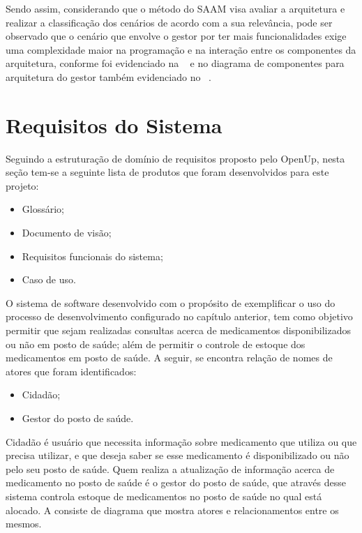 Sendo assim, considerando que o método do \acrfull{SAAM} visa avaliar a arquitetura e realizar a classificação dos cenários de acordo com a sua relevância, pode ser observado que o cenário que envolve o gestor por ter mais funcionalidades exige uma complexidade maior na programação e na interação entre os componentes da arquitetura, conforme foi evidenciado na ~ e no diagrama de componentes para arquitetura do gestor também evidenciado no ~.


\section{Requisitos do Sistema}
\label{sec:visão do sistema}

Seguindo a estruturação de domínio de requisitos proposto pelo \acrfull{OpenUp}, nesta seção tem-se a seguinte lista de produtos que foram desenvolvidos para este projeto:
\begin{itemize}
    \item Glossário;
    \item Documento de visão;
    \item Requisitos funcionais do sistema;
    \item Caso de uso.
\end{itemize}

O sistema de software desenvolvido com o propósito de  exemplificar o uso do processo de desenvolvimento configurado no capítulo anterior, tem como objetivo permitir que sejam realizadas consultas acerca de medicamentos disponibilizados ou não em posto de saúde; além de permitir o controle de estoque dos medicamentos em posto de saúde. A seguir, se encontra relação de nomes de atores que foram identificados:

\begin{itemize}
    \item Cidadão;
    \item Gestor do posto de saúde.
\end{itemize}

Cidadão é usuário que necessita informação sobre medicamento que utiliza ou que precisa utilizar, e que deseja saber se esse medicamento é disponibilizado ou não pelo seu posto de saúde. Quem realiza a atualização de informação acerca de medicamento no posto de saúde é o gestor do posto de saúde, que através desse sistema controla estoque de medicamentos no posto de saúde no qual está alocado. A  consiste de diagrama que mostra atores e relacionamentos entre os mesmos.

